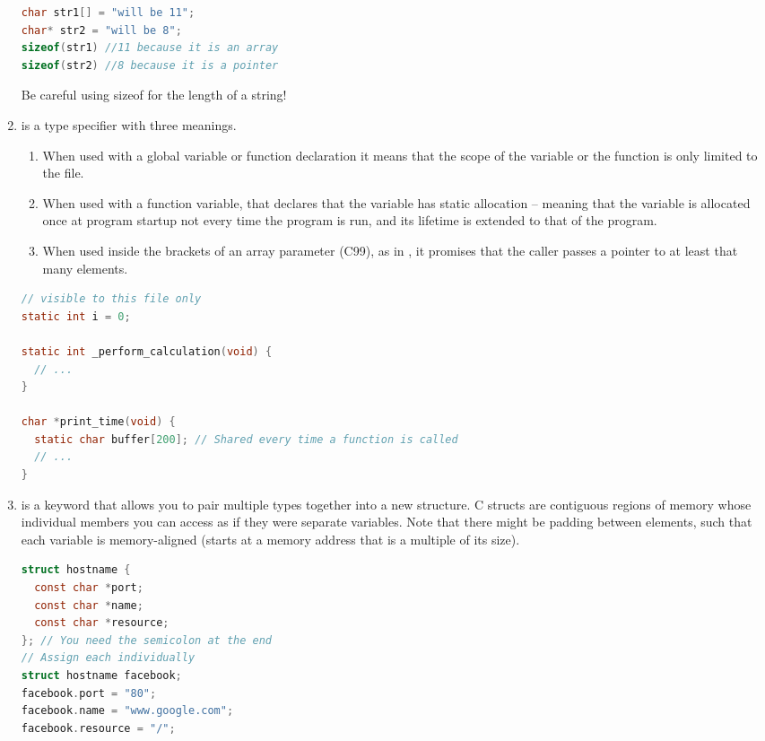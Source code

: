 \begin{enumerate}
	      \begin{lstlisting}[language=C]
char str1[] = "will be 11";
char* str2 = "will be 8";
sizeof(str1) //11 because it is an array
sizeof(str2) //8 because it is a pointer
\end{lstlisting}

	      Be careful using sizeof for the length of a string!

	\item {} is a type specifier with three meanings.

	      \begin{enumerate}
		      \item When used with a global variable or function declaration it means that the scope of the variable or the function is only limited to the file.
		      \item When used with a function variable, that declares that the variable has static allocation -- meaning that the variable is allocated once at program startup not every time the program is run, and its lifetime is extended to that of the program.
		      \item When used inside the brackets of an array parameter (C99), as in , it promises that the caller passes a pointer to at least that many elements.
	      \end{enumerate}

	      \begin{lstlisting}[language=C]
// visible to this file only
static int i = 0;

static int _perform_calculation(void) {
  // ...
}

char *print_time(void) {
  static char buffer[200]; // Shared every time a function is called
  // ...
}
\end{lstlisting}

	    \item {} is a keyword that allows you to pair multiple types together into a new structure.
        C structs are contiguous regions of memory whose individual members you can access as if they were separate variables.
        Note that there might be padding between elements, such that each variable is memory-aligned (starts at a memory address that is a multiple of its size).

	      \begin{lstlisting}[language=C]
struct hostname {
  const char *port;
  const char *name;
  const char *resource;
}; // You need the semicolon at the end
// Assign each individually
struct hostname facebook;
facebook.port = "80";
facebook.name = "www.google.com";
facebook.resource = "/";


\end{lstlisting}
\end{enumerate}
